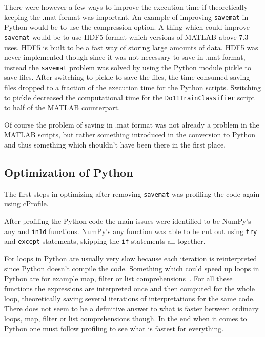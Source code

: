 \documentclass[12pt, a4paper]{article}
\begin{document}
There were however a few ways to improve the execution time if theoretically keeping the .mat format was important.
An example of improving \texttt{savemat} in Python would be to use the compression option.
A thing which could improve \texttt{savemat} would be to use HDF5 format which versions of MATLAB above 7.3 uses. 
HDF5 is built to be a fast way of storing large amounts of data.
HDF5 was never implemented though since it was not necessary to save in .mat format, instead the \texttt{savemat} problem was solved by using the Python module pickle to save files.
After switching to pickle to save the files, the time consumed saving files dropped to a fraction of the execution time for the Python scripts.
Switching to pickle decreased the computational time for the \texttt{Do11TrainClassifier} script to half of the MATLAB counterpart. %

Of course the problem of saving in .mat format was not already a problem in the MATLAB scripts, but rather something introduced in the conversion to Python and thus something which shouldn't have been there in the first place.

\subsection{Optimization of Python}
The first steps in optimizing after removing \texttt{savemat} was profiling the code again using cProfile.

After profiling the Python code the main issues were identified to be NumPy's any and \texttt{in1d} functions.
NumPy's any function was able to be cut out using \texttt{try} and \texttt{except} statements, skipping the \texttt{if} statements all together.%

For loops in Python are usually very slow because each iteration is reinterpreted since Python doesn't compile the code.
Something which could speed up loops in Python are for example map, filter or list comprehensions~\cite{Py:map, Py:filter, Py:listComprehension}. 
For all these functions the expressions are interpreted once and then computed for the whole loop, theoretically saving several iterations of interpretations for the same code. 
There does not seem to be a definitive answer to what is faster between ordinary loops, map, filter or list comprehensions though.
In the end when it comes to Python one must follow profiling to see what is fastest for everything.
\end{document}
